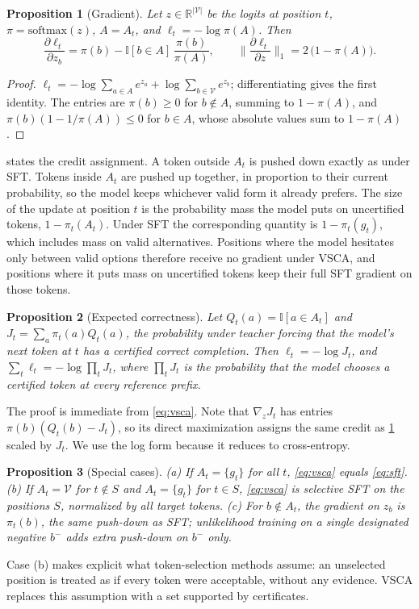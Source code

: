 \documentclass{article}
\newcommand{\vsca}{\textsc{VSCA}}
\newcommand{\ind}{\mathbb{I}}
\newcommand{\vocab}{\mathcal{V}}
\newcommand{\acc}{A}
\theoremstyle{plain}
\newtheorem{proposition}{Proposition}
\theoremstyle{remark}
\begin{document}
\begin{proposition}[Gradient]
\label{prop:gradient}
Let $z\in\mathbb{R}^{|\vocab|}$ be the logits at position $t$, $\pi=\mathrm{softmax}(z)$, $\acc=\acc_t$, and $\ell_t=-\log\pi(\acc)$. Then
\[
\frac{\partial \ell_t}{\partial z_b}=\pi(b)-\ind[b\in \acc]\,\frac{\pi(b)}{\pi(\acc)},
\qquad
\Big\|\frac{\partial \ell_t}{\partial z}\Big\|_1=2\,\big(1-\pi(\acc)\big).
\]
\end{proposition}
\begin{proof}
$\ell_t=-\log\sum_{a\in \acc}e^{z_a}+\log\sum_{b\in\vocab}e^{z_b}$; differentiating gives the first identity. The entries are $\pi(b)\geq 0$ for $b\notin \acc$, summing to $1-\pi(\acc)$, and $\pi(b)(1-1/\pi(\acc))\leq 0$ for $b\in \acc$, whose absolute values sum to $1-\pi(\acc)$.
\end{proof}

 states the credit assignment. A token outside $\acc_t$ is pushed down exactly as under SFT. Tokens inside $\acc_t$ are pushed up together, in proportion to their current probability, so the model keeps whichever valid form it already prefers. The size of the update at position $t$ is the probability mass the model puts on uncertified tokens, $1-\pi_t(\acc_t)$. Under SFT the corresponding quantity is $1-\pi_t(g_t)$, which includes mass on valid alternatives. Positions where the model hesitates only between valid options therefore receive no gradient under \vsca, and positions where it puts mass on uncertified tokens keep their full SFT gradient on those tokens.

\begin{proposition}[Expected correctness]
\label{prop:expected}
Let $Q_t(a)=\ind[a\in \acc_t]$ and $J_t=\sum_{a}\pi_t(a)Q_t(a)$, the probability under teacher forcing that the model's next token at $t$ has a certified correct completion. Then $\ell_t=-\log J_t$, and $\sum_t\ell_t=-\log\prod_tJ_t$, where $\prod_t J_t$ is the probability that the model chooses a certified token at every reference prefix.
\end{proposition}
The proof is immediate from \cref{eq:vsca}. Note that $\nabla_z J_t$ has entries $\pi(b)(Q_t(b)-J_t)$, so its direct maximization assigns the same credit as \cref{prop:gradient} scaled by $J_t$. We use the log form because it reduces to cross-entropy.

\begin{proposition}[Special cases]
\label{prop:special}
(a) If $\acc_t=\{g_t\}$ for all $t$, \cref{eq:vsca} equals \cref{eq:sft}. (b) If $\acc_t=\vocab$ for $t\notin S$ and $\acc_t=\{g_t\}$ for $t\in S$, \cref{eq:vsca} is selective SFT on the positions $S$, normalized by all target tokens. (c) For $b\notin\acc_t$, the gradient on $z_b$ is $\pi_t(b)$, the same push-down as SFT; unlikelihood training on a single designated negative $b^-$ adds extra push-down on $b^-$ only.
\end{proposition}
Case (b) makes explicit what token-selection methods assume: an unselected position is treated as if every token were acceptable, without any evidence. \vsca{} replaces this assumption with a set supported by certificates.
\end{document}
